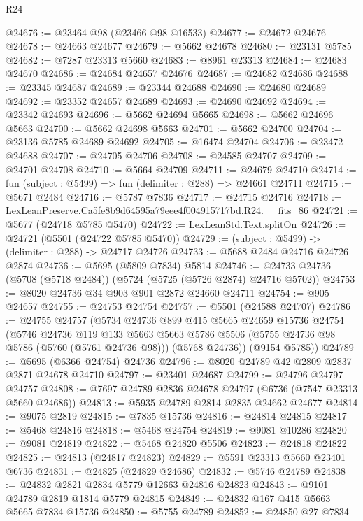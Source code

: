 \begin{lexlean}{R24}
\begin{coremodule}
@24676 := @23464 @98 (@23466 @98 @16533)
@24677 := @24672 @24676
@24678 := @24663 @24677
@24679 := @5662 @24678
@24680 := @23131 @5785
@24682 := @7287 @23313 @5660
@24683 := @8961 @23313
@24684 := @24683 @24670
@24686 := @24684 @24657 @24676
@24687 := @24682 @24686
@24688 := @23345 @24687
@24689 := @23344 @24688
@24690 := @24680 @24689
@24692 := @23352 @24657 @24689
@24693 := @24690 @24692
@24694 := @23342 @24693
@24696 := @5662 @24694 @5665
@24698 := @5662 @24696 @5663
@24700 := @5662 @24698 @5663
@24701 := @5662 @24700
@24704 := @23136 @5785 @24689 @24692
@24705 := @16474 @24704
@24706 := @23472 @24688
@24707 := @24705 @24706
@24708 := @24585 @24707
@24709 := @24701 @24708
@24710 := @5664 @24709
@24711 := @24679 @24710
@24714 := fun (subject : @5499) => fun (delimiter : @288) => @24661 @24711
@24715 := @5671 @2484
@24716 := @5787 @7836
@24717 := @24715 @24716
@24718 := LexLeanPreserve.Ca5fe8b9d64595a79eee4f004915717bd.R24.__fits_86
@24721 := @5677 (@24718 @5785 @5470)
@24722 := LexLeanStd.Text.splitOn
@24726 := @24721 (@5501 (@24722 @5785 @5470))
@24729 := (subject : @5499) -> (delimiter : @288) -> @24717 @24726
@24733 := @5688 @2484 @24716 @24726 @2874
@24736 := @5695 (@5809 @7834) @5814
@24746 := @24733 @24736 (@5708 (@5718 @2484)) (@5724 (@5725 (@5726 @2874) @24716 @5702))
@24753 := @8020 @24736 @34 @903 @901 @2872 @24660 @24711
@24754 := @905 @24657
@24755 := @24753 @24754
@24757 := @5501 (@24588 @24707)
@24786 := @24755
    @24757
    (@5734
      @24736
      @899
      @415
      @5665
      @24659
      @15736
      @24754
      (@5746
        @24736
        @119
        @133
        @5663
        @5663
        @5786
        @5506
        (@5755 @24736 @98 @5786 (@5760 (@5761 @24736 @98)))
        (@5768 @24736))
      (@9154 @5785))
@24789 := @5695 (@6366 @24754) @24736
@24796 := @8020 @24789 @42 @2809 @2837 @2871 @24678 @24710
@24797 := @23401 @24687
@24799 := @24796 @24797 @24757
@24808 := @7697 @24789 @2836 @24678 @24797 (@6736 (@7547 @23313 @5660 @24686))
@24813 := @5935 @24789 @2814 @2835 @24662 @24677
@24814 := @9075 @2819
@24815 := @7835 @15736
@24816 := @24814 @24815
@24817 := @5468 @24816
@24818 := @5468 @24754
@24819 := @9081 @10286
@24820 := @9081 @24819
@24822 := @5468 @24820 @5506
@24823 := @24818 @24822
@24825 := @24813 (@24817 @24823)
@24829 := @5591 @23313 @5660 @23401 @6736
@24831 := @24825 (@24829 @24686)
@24832 := @5746 @24789
@24838 := @24832 @2821 @2834 @5779 @12663 @24816 @24823
@24843 := @9101 @24789 @2819 @1814 @5779 @24815
@24849 := @24832 @167 @415 @5663 @5665 @7834 @15736
@24850 := @5755 @24789
@24852 := @24850 @27 @7834

\end{coremodule}
\end{lexlean}
